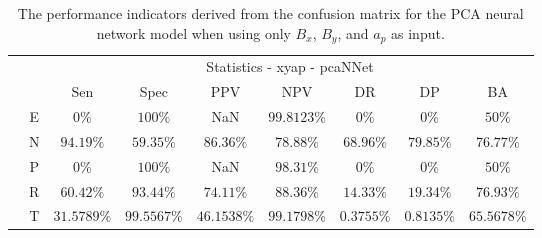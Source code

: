 \begin{table}[!ht]
	\centering
	\begin{tabular}{|c|c|c|c|c|c|c|c|c|}
		\cline{3-9}
		\multicolumn{2}{c|}{} & \multicolumn{7}{c|}{Statistics - xyap - pcaNNet} \\ \cline{3-9}
		\multicolumn{2}{c|}{} & Sen & Spec & PPV & NPV & DR & DP & BA \\ \hline
		\multirow{5}{*}{\rotatebox{90}{Class}} & E & $0\%$ & $100\%$ & NaN & $99.8123\%$ & $0\%$ & $0\%$ & $50\%$ \\ \cline{2-9}
		 & N & $94.19\%$ & $59.35\%$ & $86.36\%$ & $78.88\%$ & $68.96\%$ & $79.85\%$ & $76.77\%$ \\ \cline{2-9}
		 & P & $0\%$ & $100\%$ & NaN & $98.31\%$ & $0\%$ & $0\%$ & $50\%$ \\ \cline{2-9}
		 & R & $60.42\%$ & $93.44\%$ & $74.11\%$ & $88.36\%$ & $14.33\%$ & $19.34\%$ & $76.93\%$ \\ \cline{2-9}
		 & T & $31.5789\%$ & $99.5567\%$ & $46.1538\%$ & $99.1798\%$ & $0.3755\%$ & $0.8135\%$ & $65.5678\%$ \\ \hline
	\end{tabular}
	\caption{The performance indicators derived from the confusion matrix for the PCA neural network model when using only $B_{x}$, $B_{y}$, and $a_{p}$ as input.}
	\label{tab:cs:xyap:pcaNNet}
\end{table}
